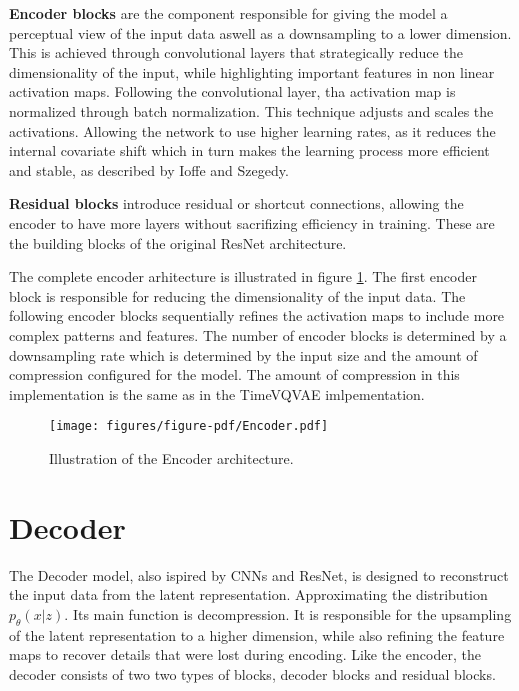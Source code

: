 \textbf{Encoder blocks} are the component responsible for giving the model a perceptual view of the input data aswell as a downsampling to a lower dimension. This is achieved through convolutional layers that strategically reduce the dimensionality of the input, while highlighting important features in non linear activation maps. 
Following the convolutional layer, tha activation map is normalized through batch normalization. This technique adjusts and scales the activations. Allowing the network to use higher learning rates, as it reduces the internal covariate shift which in turn makes the learning process more efficient and stable, as described by Ioffe and Szegedy\cite{batchnorm}.

\textbf{Residual blocks} introduce residual or shortcut connections, allowing the encoder to have more layers without sacrifizing efficiency in training. 
These are the building blocks of the original ResNet architecture.

The complete encoder arhitecture is illustrated in figure \ref{fig:Encoder}. The first encoder block is responsible for reducing the dimensionality of the input data. The following encoder blocks sequentially refines the activation maps to include more complex patterns and features.
The number of encoder blocks is determined by a downsampling rate which is determined by the input size and the amount of compression configured for the model. The amount of compression in this implementation is the same as in the TimeVQVAE imlpementation.


\begin{figure}[H]
    \texttt{[image: figures/figure-pdf/Encoder.pdf]}
    \caption{Illustration of the Encoder architecture.}
    \label{fig:Encoder}
\end{figure}

\section{Decoder}
The Decoder model, also ispired by CNNs and ResNet, is designed to reconstruct the input data from the latent representation. Approximating the distribution $p_\theta(x|z)$.
Its main function is decompression. It is responsible for the upsampling of the latent representation to a higher dimension, while also refining the feature maps to recover details that were lost during encoding.
Like the encoder, the decoder consists of two two types of blocks, decoder blocks and residual blocks.


